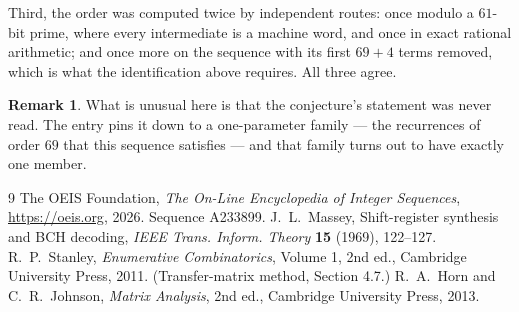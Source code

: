 \documentclass[11pt,a4paper]{article}
\theoremstyle{plain}
\theoremstyle{definition}
\newtheorem{remark}[theorem]{Remark}
\begin{document}
Third, the order was computed twice by independent routes: once modulo a $61$-bit prime, where
every intermediate is a machine word, and once in exact rational arithmetic; and once more on
the sequence with its first $69+4$ terms removed, which is what the identification above
requires. All three agree.

\begin{remark}
What is unusual here is that the conjecture's statement was never read. The entry pins it down
to a one-parameter family --- the recurrences of order $69$ that this sequence satisfies
--- and that family turns out to have exactly one member.
\end{remark}

\begin{thebibliography}{9}
 The OEIS Foundation, \emph{The On-Line Encyclopedia of Integer
Sequences}, \url{https://oeis.org}, 2026. Sequence A233899.
 J.~L.~Massey, Shift-register synthesis and BCH decoding, \emph{IEEE
Trans. Inform. Theory} \textbf{15} (1969), 122--127.
 R.~P.~Stanley, \emph{Enumerative Combinatorics}, Volume 1, 2nd ed.,
Cambridge University Press, 2011. (Transfer-matrix method, Section 4.7.)
 R.~A.~Horn and C.~R.~Johnson, \emph{Matrix Analysis}, 2nd ed., Cambridge
University Press, 2013.
\end{thebibliography}
\end{document}

